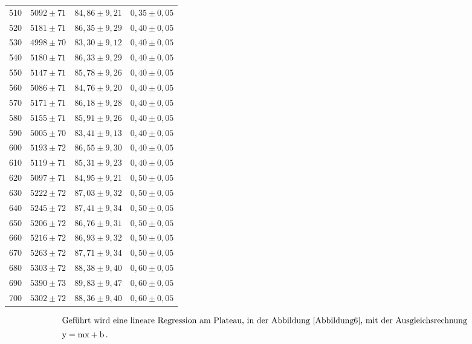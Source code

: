 \begin{table}[H]
\begin{tabular} {c  c  c  c}
        510 & $ 5092 \pm 71 $ & $ 84,86 \pm 9,21 $ & $ 0,35 \pm 0,05 $  \\
        520 & $ 5181 \pm 71 $ & $ 86,35 \pm 9,29 $ & $ 0,40 \pm 0,05 $  \\
        530 & $ 4998 \pm 70 $ & $ 83,30 \pm 9,12 $ & $ 0,40 \pm 0,05 $  \\
        540 & $ 5180 \pm 71 $ & $ 86,33 \pm 9,29 $ & $ 0,40 \pm 0,05 $  \\
        550 & $ 5147 \pm 71 $ & $ 85,78 \pm 9,26 $ & $ 0,40 \pm 0,05 $  \\
        560 & $ 5086 \pm 71 $ & $ 84,76 \pm 9,20 $ & $ 0,40 \pm 0,05 $  \\
        570 & $ 5171 \pm 71 $ & $ 86,18 \pm 9,28 $ & $ 0,40 \pm 0,05 $  \\
        580 & $ 5155 \pm 71 $ & $ 85,91 \pm 9,26 $ & $ 0,40 \pm 0,05 $  \\
        590 & $ 5005 \pm 70 $ & $ 83,41 \pm 9,13 $ & $ 0,40 \pm 0,05 $  \\
        600 & $ 5193 \pm 72 $ & $ 86,55 \pm 9,30 $ & $ 0,40 \pm 0,05 $  \\
        610 & $ 5119 \pm 71 $ & $ 85,31 \pm 9,23 $ & $ 0,40 \pm 0,05 $  \\
        620 & $ 5097 \pm 71 $ & $ 84,95 \pm 9,21 $ & $ 0,50 \pm 0,05 $  \\
        630 & $ 5222 \pm 72 $ & $ 87,03 \pm 9,32 $ & $ 0,50 \pm 0,05 $  \\
        640 & $ 5245 \pm 72 $ & $ 87,41 \pm 9,34 $ & $ 0,50 \pm 0,05 $  \\
        650 & $ 5206 \pm 72 $ & $ 86,76 \pm 9,31 $ & $ 0,50 \pm 0,05 $  \\
        660 & $ 5216 \pm 72 $ & $ 86,93 \pm 9,32 $ & $ 0,50 \pm 0,05 $  \\
        670 & $ 5263 \pm 72 $ & $ 87,71 \pm 9,34 $ & $ 0,50 \pm 0,05 $  \\
        680 & $ 5303 \pm 72 $ & $ 88,38 \pm 9,40 $ & $ 0,60 \pm 0,05 $  \\
        690 & $ 5390 \pm 73 $ & $ 89,83 \pm 9,47 $ & $ 0,60 \pm 0,05 $  \\
        700 & $ 5302 \pm 72 $ & $ 88,36 \pm 9,40 $ & $ 0,60 \pm 0,05 $  \\
        \bottomrule
    \end{tabular} 
\end{table}

\begin{align*}
    \intertext{Geführt wird eine lineare Regression am Plateau, in der Abbildung \ref{Abbildung6}, mit der Ausgleichsrechnung}
    \text{y} = \text{mx} + \text{b}\,.
\end{align*}

